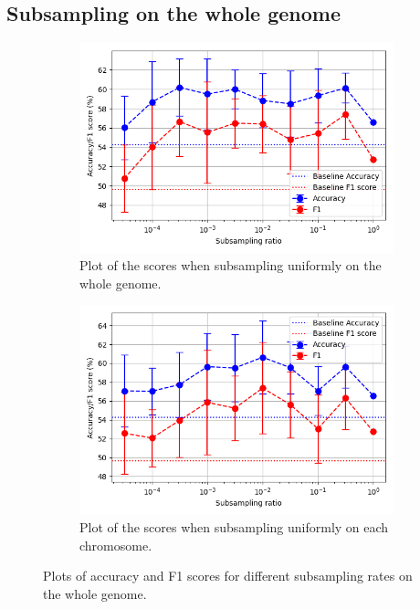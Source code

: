 \subsection{Subsampling on the whole genome}
\begin{figure}[ht!]
    \centering
    \begin{subfigure}[t]{0.49\textwidth}
    \centering
\includegraphics[width=\columnwidth]{figures/subsample_plot.png}
\caption{Plot of the scores when subsampling uniformly on the whole genome.}
\label{fig:res1a}
    \end{subfigure}
    \begin{subfigure}[t]{0.49\textwidth}
    \centering
\includegraphics[width=\columnwidth]{figures/uniform_sample_low_ratio.png}
\caption{Plot of the scores when subsampling uniformly on each chromosome.}
\label{fig:res1b}
    \end{subfigure}
\caption{Plots of accuracy and F1 scores for different subsampling rates on the whole genome.}
\label{fig:res1}
\end{figure}

